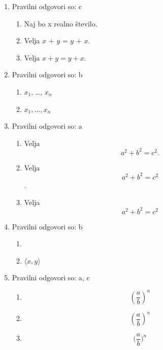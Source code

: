 \documentclass[11pt]{article}
\begin{document}
\begin{enumerate}
    \item Pravilni odgovori so: c %
    \begin{enumerate}
        \item Naj bo x realno število.
        \item Velja \(x\) + \(y\) = \(y\) + \(x\).
        \item Velja \(x + y = y + x\).
    \end{enumerate}

    \item Pravilni odgovori so: b %
    \begin{enumerate}
        \item \(x_1\), \dots, \(x_n\)
        \item \(x_1, \ldots, x_n\)
    \end{enumerate}

    \item Pravilni odgovori so: a %
    \begin{enumerate}
        \item
Velja
\[
  a^2 + b^2 = c^2.
\]
        \item
Velja
\[
  a^2 + b^2 = c^2
\]
.
        \item
Velja
\[
  a^2 + b^2 = c^2
\]
    \end{enumerate}

    \item Pravilni odgovori so: b %
    \begin{enumerate}
        \item \(<x, y>\)
        \item \(\langle x, y \rangle\)
    \end{enumerate}

    \item Pravilni odgovori so: a, c %
    \begin{enumerate}
        \item \[ (\frac{a}{b})^n \]
        \item \[ \left(\frac{a}{b}\right)^n \]
        \item \[ \Big(\frac{a}{b}\Big)^n \]
    \end{enumerate}


\end{enumerate}
\end{document}

